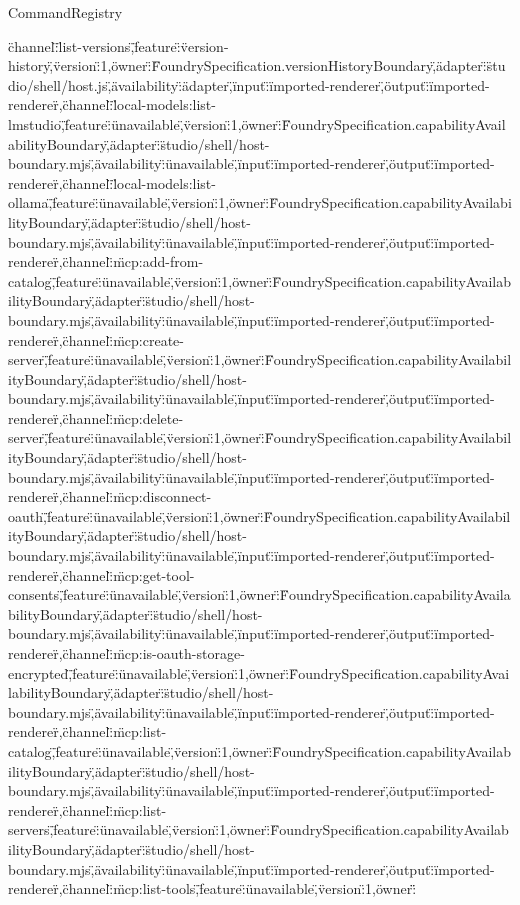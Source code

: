 \begin{lexlean}{CommandRegistry}
\begin{semanticmodule}
{\"channel\":\"list-versions\",\"feature\":\"version-history\",\"version\":1,\"owner\":\"FoundrySpecification.versionHistoryBoundary\",\"adapter\":\"studio/shell/host.js\",\"availability\":\"adapter\",\"input\":\"imported-renderer\",\"output\":\"imported-renderer\"},{\"channel\":\"local-models:list-lmstudio\",\"feature\":\"unavailable\",\"version\":1,\"owner\":\"FoundrySpecification.capabilityAvailabilityBoundary\",\"adapter\":\"studio/shell/host-boundary.mjs\",\"availability\":\"unavailable\",\"input\":\"imported-renderer\",\"output\":\"imported-renderer\"},{\"channel\":\"local-models:list-ollama\",\"feature\":\"unavailable\",\"version\":1,\"owner\":\"FoundrySpecification.capabilityAvailabilityBoundary\",\"adapter\":\"studio/shell/host-boundary.mjs\",\"availability\":\"unavailable\",\"input\":\"imported-renderer\",\"output\":\"imported-renderer\"},{\"channel\":\"mcp:add-from-catalog\",\"feature\":\"unavailable\",\"version\":1,\"owner\":\"FoundrySpecification.capabilityAvailabilityBoundary\",\"adapter\":\"studio/shell/host-boundary.mjs\",\"availability\":\"unavailable\",\"input\":\"imported-renderer\",\"output\":\"imported-renderer\"},{\"channel\":\"mcp:create-server\",\"feature\":\"unavailable\",\"version\":1,\"owner\":\"FoundrySpecification.capabilityAvailabilityBoundary\",\"adapter\":\"studio/shell/host-boundary.mjs\",\"availability\":\"unavailable\",\"input\":\"imported-renderer\",\"output\":\"imported-renderer\"},{\"channel\":\"mcp:delete-server\",\"feature\":\"unavailable\",\"version\":1,\"owner\":\"FoundrySpecification.capabilityAvailabilityBoundary\",\"adapter\":\"studio/shell/host-boundary.mjs\",\"availability\":\"unavailable\",\"input\":\"imported-renderer\",\"output\":\"imported-renderer\"},{\"channel\":\"mcp:disconnect-oauth\",\"feature\":\"unavailable\",\"version\":1,\"owner\":\"FoundrySpecification.capabilityAvailabilityBoundary\",\"adapter\":\"studio/shell/host-boundary.mjs\",\"availability\":\"unavailable\",\"input\":\"imported-renderer\",\"output\":\"imported-renderer\"},{\"channel\":\"mcp:get-tool-consents\",\"feature\":\"unavailable\",\"version\":1,\"owner\":\"FoundrySpecification.capabilityAvailabilityBoundary\",\"adapter\":\"studio/shell/host-boundary.mjs\",\"availability\":\"unavailable\",\"input\":\"imported-renderer\",\"output\":\"imported-renderer\"},{\"channel\":\"mcp:is-oauth-storage-encrypted\",\"feature\":\"unavailable\",\"version\":1,\"owner\":\"FoundrySpecification.capabilityAvailabilityBoundary\",\"adapter\":\"studio/shell/host-boundary.mjs\",\"availability\":\"unavailable\",\"input\":\"imported-renderer\",\"output\":\"imported-renderer\"},{\"channel\":\"mcp:list-catalog\",\"feature\":\"unavailable\",\"version\":1,\"owner\":\"FoundrySpecification.capabilityAvailabilityBoundary\",\"adapter\":\"studio/shell/host-boundary.mjs\",\"availability\":\"unavailable\",\"input\":\"imported-renderer\",\"output\":\"imported-renderer\"},{\"channel\":\"mcp:list-servers\",\"feature\":\"unavailable\",\"version\":1,\"owner\":\"FoundrySpecification.capabilityAvailabilityBoundary\",\"adapter\":\"studio/shell/host-boundary.mjs\",\"availability\":\"unavailable\",\"input\":\"imported-renderer\",\"output\":\"imported-renderer\"},{\"channel\":\"mcp:list-tools\",\"feature\":\"unavailable\",\"version\":1,\"owner\":\"}
\end{semanticmodule}
\end{lexlean}
